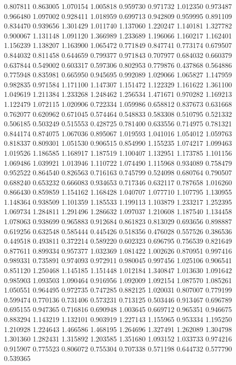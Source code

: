 0.807811
0.863005
1.070154
1.005818
0.959730
0.971732
1.012350
0.973487
0.966480
1.097002
0.928411
1.018959
0.699713
0.942809
0.959995
0.891109
0.834470
0.939656
1.301429
1.011740
1.137060
1.220247
1.140181
1.327782
0.900067
1.131148
1.091120
1.366989
1.233689
1.196066
1.160217
1.162401
1.156239
1.138207
1.163900
1.065472
0.771849
0.847741
0.773174
0.679507
0.844032
0.811458
0.644659
0.799377
0.971843
0.707977
0.684032
0.660379
0.637844
0.549002
0.603317
0.597306
0.802953
0.779876
0.437868
0.564886
0.775948
0.835981
0.665950
0.945695
0.992089
1.029066
1.065827
1.147959
0.982835
0.971584
1.171100
1.147307
1.151472
1.122329
1.161622
1.361100
1.049619
1.211384
1.233268
1.248462
1.256534
1.471671
0.970282
1.169213
1.122479
1.072115
1.020906
0.722334
1.059986
0.658812
0.837673
0.631668
0.762077
0.620962
0.671045
0.574464
0.548833
0.583308
0.510795
0.521332
0.506185
0.503249
0.515553
0.428725
0.781400
0.633556
0.714975
0.781321
0.844174
0.874075
1.067036
0.895067
1.019593
1.041016
1.054012
1.059763
0.818337
0.809301
1.051530
0.906515
0.854990
1.155235
1.074217
1.099463
1.019526
1.186585
1.168917
1.187519
1.100407
1.132951
1.173785
1.101156
1.069486
1.039921
1.013946
1.110722
1.074490
1.115968
0.934089
0.758479
0.952522
0.864540
0.826563
0.716163
0.745799
0.524098
0.680764
0.790507
0.688240
0.653232
0.666083
0.934653
0.717346
0.632117
0.787658
1.016260
0.866430
0.859859
1.154162
1.168428
1.040707
1.077710
1.107795
1.130955
1.148364
0.938509
1.101359
1.185533
1.199113
1.103879
1.233217
1.252395
1.069734
1.284811
1.291496
1.286632
1.097037
1.210608
1.187540
1.134458
1.078063
0.938699
0.965883
0.912684
0.861823
0.813029
0.693656
0.898887
0.619256
0.632548
0.585444
0.445426
0.518356
0.476028
0.557526
0.386536
0.449518
0.493811
0.372214
0.589220
0.602323
0.696795
0.756539
0.821649
0.877611
0.899334
0.957377
1.032369
1.081422
1.002626
0.870951
0.997416
0.989331
0.735891
0.974093
0.972911
0.980045
0.997456
1.025106
0.906541
0.851120
1.250468
1.145185
1.151448
1.012184
1.340847
1.013630
1.091642
0.985903
1.093503
1.090464
0.916956
1.092009
1.092154
1.087570
1.085261
1.050551
0.964495
0.972735
0.747285
0.882125
1.020031
0.807007
0.779199
0.599474
0.770136
0.731406
0.573231
0.713125
0.503446
0.913467
0.696789
0.695155
0.947365
0.716816
0.690948
1.003645
0.669712
0.965351
0.946675
0.883294
1.143219
1.132101
0.903919
1.227143
1.155965
0.953334
1.195250
1.210928
1.224643
1.466586
1.468195
1.264696
1.327491
1.262089
1.304798
1.301360
1.282431
1.315892
1.203585
1.351680
1.093152
1.033733
0.974216
0.915907
0.775523
0.806072
0.755304
0.707338
0.571198
0.644732
0.577790
0.539365
